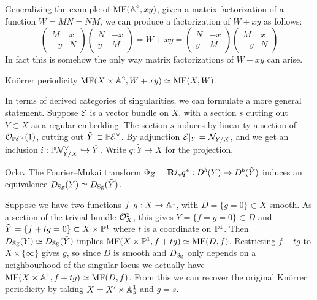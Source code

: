 Generalizing the example of $\MF(\A^2,xy)$, given a matrix factorization of a
function $W=MN=NM$, we can produce a factorization of $W+xy$ as follows:
\begin{equation*}
    \begin{pmatrix}
        M & x \\ -y & N
    \end{pmatrix}\begin{pmatrix}
        N & -x \\ y & M
    \end{pmatrix}
        = W+xy =
    \begin{pmatrix}
        N & -x \\ y & M
    \end{pmatrix}\begin{pmatrix}
        M & x \\ -y & N
    \end{pmatrix}
\end{equation*}
In fact this is somehow the only way matrix factorizations of $W+xy$ can arise.

\begin{theorem}{Kn\"orrer periodicity}{}
    $\MF(X\times\A^2,W+xy)\simeq\MF(X,W)$.
\end{theorem}

In terms of derived categories of singularities, we can formulate a more general
statement. Suppose $\calE$ is a vector bundle on $X$, with a section $s$ cutting
out $Y\subset X$ as a regular embedding. The section $s$ induces by linearity a
section of $\O_{\P\calE^\vee}(1)$, cutting out $\tilde Y\subset\P\calE^\vee$. By
adjunction $\calE|_Y=\calN_{Y/X}$, and we get an inclusion
$i:\P\calN^\vee_{Y/X}\hookrightarrow\tilde Y$. Write $q:\tilde Y\to X$ for the
projection.

\begin{theorem}{Orlov \cite{OrlovKnorrer}}{}
    The Fourier--Mukai transform $\Phi_Z=\dR i_*q^*:D^b(Y)\to D^b(\tilde Y)$
    induces an equivalence $D_\Sg(Y)\simeq D_\Sg(\tilde Y)$.
\end{theorem}

\begin{example}{}{}
    Suppose we have two functions $f,g:X\to\A^1$, with $D=\{g=0\}\subset X$
    smooth. As a section of the trivial bundle $\O_X^2$, this gives
    $Y=\{f=g=0\}\subset D$ and $\tilde Y=\{f+tg=0\}\subset X\times\P^1$
    where $t$ is a coordinate on $\P^1$. Then $D_\Sg(Y)\simeq D_\Sg(\tilde Y)$
    implies $\MF(X\times\P^1,f+tg)\simeq\MF(D,f)$. Restricting $f+tg$ to
    $X\times\{\infty\}$ gives $g$, so since $D$ is smooth and $D_\Sg$ only
    depends on a neighbourhood of the singular locus we actually have
    $\MF(X\times\A^1,f+tg)\simeq\MF(D,f)$. From this we can recover the original
    Kn\"orrer periodicity by taking $X=X'\times\A^1_s$ and $g=s$.
\end{example}

